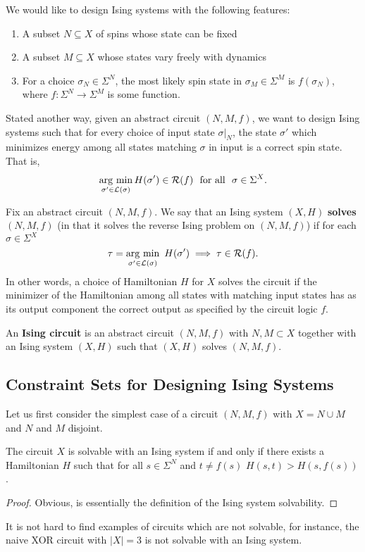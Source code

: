\documentclass{article}
\begin{document}
We would like to design Ising systems with the following features:
\begin{enumerate}[(1)]
  \item A subset $N \subseteq X$ of spins whose state can be fixed
  \item A subset $M \subseteq X$ whose states vary freely with dynamics
  \item For a choice $\sigma_N \in \Sigma^N$, the most likely spin state in $\sigma_M \in \Sigma^M$ is $f(\sigma_N)$, where $f: \Sigma^N \to \Sigma^M$ is some function.
\end{enumerate}
Stated another way, given an abstract circuit $(N,M,f)$, we want to design Ising systems such that for every choice of input state $\sigma|_N$, the state $\sigma'$ which minimizes energy among all states matching $\sigma$ in input is a correct spin state. That is,
\begin{align*}
  \operatorname*{arg ~ min}_{\sigma' \in \mathcal{L}(\sigma)} H(\sigma') \in \mathcal{R}(f) ~ \text{ for all } ~ \sigma \in \Sigma^X.
\end{align*}

\begin{defn}\label{defn:solves-ising-circuit}
  Fix an abstract circuit $(N, M, f)$. We say that an Ising system $(X, H)$ \textbf{solves} $(N, M, f)$ (in that it solves the reverse Ising problem on $(N,M,f)$) if for each $\sigma \in \Sigma^X$ 
  \begin{align*}
    \tau = \operatorname*{arg ~ min}_{\sigma' \in \mathcal{L}(\sigma)} ~H(\sigma') \implies \tau \in \mathcal{R}(f).
  \end{align*}
  In other words, a choice of Hamiltonian $H$ for $X$ solves the circuit if the minimizer of the Hamiltonian among all states with matching input states has as its output component the correct output as specified by the circuit logic $f$.

  An \textbf{Ising circuit} is an abstract circuit $(N,M,f)$ with $N,M \subset X$ together with an Ising system $(X,H)$ such that $(X,H)$ solves $(N,M,f)$.
\end{defn}

\subsection{Constraint Sets for Designing Ising Systems}
Let us first consider the simplest case of a circuit $(N, M, f)$ with $X = N \cup M$ and $N$ and $M$ disjoint.
\begin{lem}\label{lem:original-constraint-set}
  The circuit $X$ is solvable with an Ising system if and only if there exists a Hamiltonian $H$ such that for all $s\in \Sigma^N$ and $t \neq f(s)$ $H(s,t) > H(s,f(s))$.
\end{lem}
\begin{proof}
  Obvious, is essentially the definition of the Ising system solvability.
\end{proof}
It is not hard to find examples of circuits which are not solvable, for instance, the naive XOR circuit with $|X| = 3$ is not solvable with an Ising system.
\end{document}
